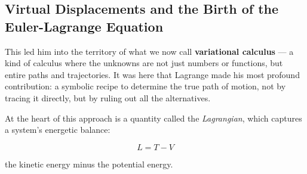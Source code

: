 \subsection{Virtual Displacements and the Birth of the Euler-Lagrange Equation}

This led him into the territory of what we now call \textbf{variational calculus} — a kind of calculus where the unknowns are not just numbers or functions, but entire paths and trajectories. It was here that Lagrange made his most profound contribution: a symbolic recipe to determine the true path of motion, not by tracing it directly, but by ruling out all the alternatives.

At the heart of this approach is a quantity called the \textit{Lagrangian}, which captures a system’s energetic balance:

\[
L = T - V
\]

the kinetic energy minus the potential energy.

\medskip

